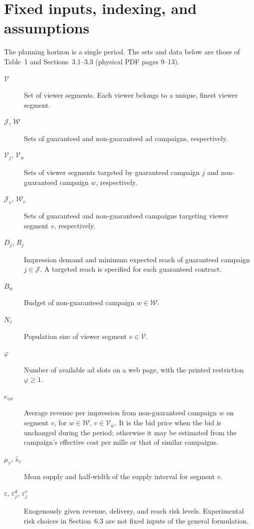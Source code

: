 \documentclass{article}
\begin{document}
\section*{Fixed inputs, indexing, and assumptions}
The planning horizon is a single period. The sets and data below are those of Table~1 and Sections~3.1--3.3 (physical PDF pages 9--13).
\begin{description}
\item[$\mathcal V$] Set of viewer segments. Each viewer belongs to a unique, finest viewer segment.
\item[$\mathcal J$, $\mathcal W$] Sets of guaranteed and non-guaranteed ad campaigns, respectively.
\item[$\mathcal V_j$, $\mathcal V_w$] Sets of viewer segments targeted by guaranteed campaign $j$ and non-guaranteed campaign $w$, respectively.
\item[$\mathcal J_v$, $\mathcal W_v$] Sets of guaranteed and non-guaranteed campaigns targeting viewer segment $v$, respectively.
\item[$D_j$, $R_j$] Impression demand and minimum expected reach of guaranteed campaign $j\in\mathcal J$. A targeted reach is specified for each guaranteed contract.
\item[$B_w$] Budget of non-guaranteed campaign $w\in\mathcal W$.
\item[$N_v$] Population size of viewer segment $v\in\mathcal V$.
\item[$\varphi$] Number of available ad slots on a web page, with the printed restriction $\varphi\geq1$.
\item[$e_{vw}$] Average revenue per impression from non-guaranteed campaign $w$ on segment $v$, for $w\in\mathcal W$, $v\in\mathcal V_w$. It is the bid price when the bid is unchanged during the period; otherwise it may be estimated from the campaign's effective cost per mille or that of similar campaigns.
\item[$\mu_v$, $\hat s_v$] Mean supply and half-width of the supply interval for segment $v$.
\item[$\varepsilon$, $\varepsilon^d_j$, $\varepsilon^r_j$] Exogenously given revenue, delivery, and reach risk levels. Experimental risk choices in Section~6.3 are not fixed inputs of the general formulation.
\end{description}
\end{document}
